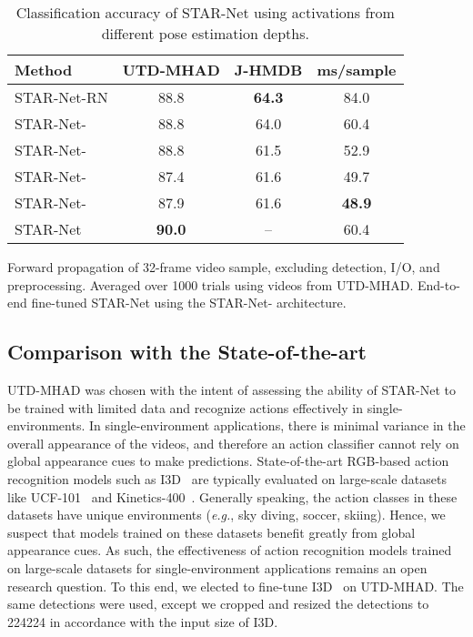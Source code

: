 \documentclass[10pt, conference, compsocconf]{IEEEtran}
\begin{document}
\begin{table}
\caption{Classification accuracy of STAR-Net using activations from different pose estimation depths.}
\vspace{-10pt}
\label{tab:starnet_results}
\begin{center}
\begin{tabular}{|l|c|c|c|}
\hline
Method & UTD-MHAD & J-HMDB & ms/sample\\
\hline\hline
STAR-Net-RN & 88.8 & \textbf{64.3} & 84.0\\
STAR-Net- & 88.8 & 64.0 & 60.4\\
STAR-Net- & 88.8 & 61.5 & 52.9\\
STAR-Net- & 87.4 & 61.6 & 49.7\\
STAR-Net- & 87.9 & 61.6 & \textbf{48.9}\\
\hline
STAR-Net & \textbf{90.0} & -- & 60.4\\
\hline
\end{tabular}
\end{center}
Forward propagation of 32-frame video sample, excluding detection, I/O, and preprocessing. Averaged over 1000 trials using videos from UTD-MHAD. 
End-to-end fine-tuned STAR-Net using the STAR-Net- architecture.
\vspace{-15pt}
\end{table}

\subsection{Comparison with the State-of-the-art}

UTD-MHAD was chosen with the intent of assessing the ability of STAR-Net to be trained with limited data and recognize actions effectively in single-environments. In single-environment applications, there is minimal variance in the overall appearance of the videos, and therefore an action classifier cannot rely on global appearance cues to make predictions. State-of-the-art RGB-based action recognition models such as I3D~\cite{carreira2017quo} are typically evaluated on large-scale datasets like UCF-101~\cite{soomro2012ucf101} and Kinetics-400~\cite{kay2017kinetics}. Generally speaking, the action classes in these datasets have unique environments (\textit{e.g.}, sky diving, soccer, skiing). Hence, we suspect that models trained on these datasets benefit greatly from global appearance cues. As such, the effectiveness of action recognition models trained on large-scale datasets for single-environment applications remains an open research question. To this end, we elected to fine-tune I3D~\cite{carreira2017quo} on UTD-MHAD. The same detections were used, except we cropped and resized the detections to 224224 in accordance with the input size of I3D.
\end{document}

